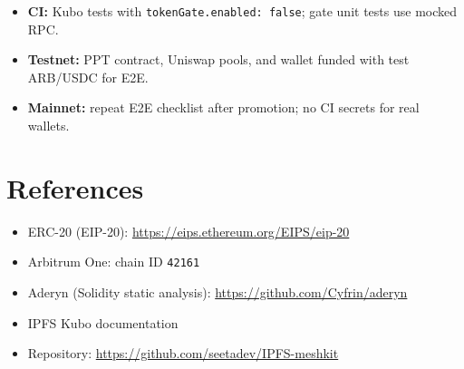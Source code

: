 \documentclass[11pt,a4paper,openany]{report}
\begin{document}
\begin{itemize}[leftmargin=*]
  \item \textbf{CI:} Kubo tests with \texttt{tokenGate.enabled: false}; gate unit tests use mocked RPC.
  \item \textbf{Testnet:} PPT contract, Uniswap pools, and wallet funded with test ARB/USDC for E2E.
  \item \textbf{Mainnet:} repeat E2E checklist after promotion; no CI secrets for real wallets.
\end{itemize}

\chapter{References}

\begin{itemize}[leftmargin=*]
  \item ERC-20 (EIP-20): \url{https://eips.ethereum.org/EIPS/eip-20}
  \item Arbitrum One: chain ID \texttt{42161}
  \item Aderyn (Solidity static analysis): \url{https://github.com/Cyfrin/aderyn}
  \item IPFS Kubo documentation
  \item Repository: \url{https://github.com/seetadev/IPFS-meshkit}
\end{itemize}
\end{document}
